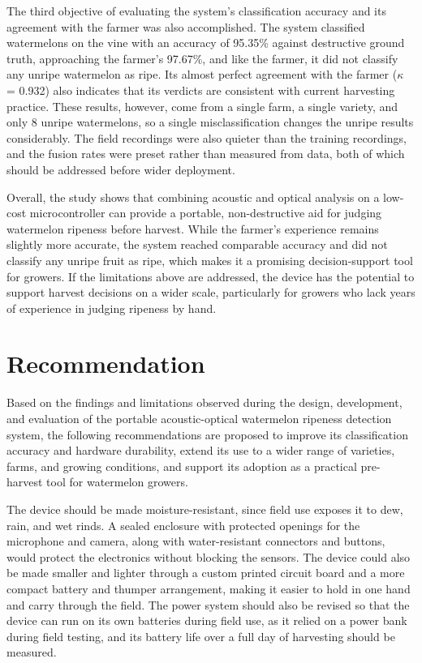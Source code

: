 \begin{thesisprose}
The third objective of evaluating the system's classification accuracy and its agreement with the farmer was also accomplished. The system classified watermelons on the vine with an accuracy of 95.35\% against destructive ground truth, approaching the farmer's 97.67\%, and like the farmer, it did not classify any unripe watermelon as ripe. Its almost perfect agreement with the farmer (\ensuremath{\kappa} = 0.932) also indicates that its verdicts are consistent with current harvesting practice. These results, however, come from a single farm, a single variety, and only 8 unripe watermelons, so a single misclassification changes the unripe results considerably. The field recordings were also quieter than the training recordings, and the fusion rates were preset rather than measured from data, both of which should be addressed before wider deployment.

Overall, the study shows that combining acoustic and optical analysis on a low-cost microcontroller can provide a portable, non-destructive aid for judging watermelon ripeness before harvest. While the farmer's experience remains slightly more accurate, the system reached comparable accuracy and did not classify any unripe fruit as ripe, which makes it a promising decision-support tool for growers. If the limitations above are addressed, the device has the potential to support harvest decisions on a wider scale, particularly for growers who lack years of experience in judging ripeness by hand.

\section{Recommendation}

Based on the findings and limitations observed during the design, development, and evaluation of the portable acoustic-optical watermelon ripeness detection system, the following recommendations are proposed to improve its classification accuracy and hardware durability, extend its use to a wider range of varieties, farms, and growing conditions, and support its adoption as a practical pre-harvest tool for watermelon growers.

The device should be made moisture-resistant, since field use exposes it to dew, rain, and wet rinds. A sealed enclosure with protected openings for the microphone and camera, along with water-resistant connectors and buttons, would protect the electronics without blocking the sensors. The device could also be made smaller and lighter through a custom printed circuit board and a more compact battery and thumper arrangement, making it easier to hold in one hand and carry through the field. The power system should also be revised so that the device can run on its own batteries during field use, as it relied on a power bank during field testing, and its battery life over a full day of harvesting should be measured.


\end{thesisprose}
